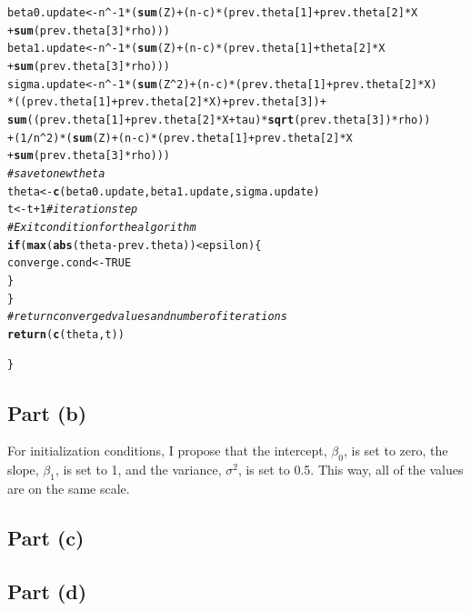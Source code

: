 \documentclass{article}\usepackage[]{graphicx}\usepackage[]{color}
\makeatletter
\newcommand{\hlnum}[1]{\textcolor[rgb]{0.686,0.059,0.569}{#1}}%
\newcommand{\hlcom}[1]{\textcolor[rgb]{0.678,0.584,0.686}{\textit{#1}}}%
\newcommand{\hlopt}[1]{\textcolor[rgb]{0,0,0}{#1}}%
\newcommand{\hlstd}[1]{\textcolor[rgb]{0.345,0.345,0.345}{#1}}%
\newcommand{\hlkwa}[1]{\textcolor[rgb]{0.161,0.373,0.58}{\textbf{#1}}}%
\newcommand{\hlkwb}[1]{\textcolor[rgb]{0.69,0.353,0.396}{#1}}%
\newcommand{\hlkwd}[1]{\textcolor[rgb]{0.737,0.353,0.396}{\textbf{#1}}}%
\newenvironment{kframe}{%
 \def\at@end@of@kframe{}%
 \ifinner\ifhmode%
  \def\at@end@of@kframe{\end{minipage}}%
  \begin{minipage}{\columnwidth}%
 \fi\fi%
 \def\FrameCommand##1{\hskip\@totalleftmargin \hskip-\fboxsep
 \colorbox{shadecolor}{##1}\hskip-\fboxsep
     \hskip-\linewidth \hskip-\@totalleftmargin \hskip\columnwidth}%
 \MakeFramed {\advance\hsize-\width
   \@totalleftmargin\z@ \linewidth\hsize
   \@setminipage}}%
 {\par\unskip\endMakeFramed%
 \at@end@of@kframe}
\newenvironment{knitrout}{}{} %
\makeatother
\begin{document}
\begin{knitrout}
\begin{kframe}
\begin{alltt}
    \hlstd{beta0.update} \hlkwb{<-} \hlstd{n}\hlopt{^-}\hlnum{1}\hlopt{*}\hlstd{(}\hlkwd{sum}\hlstd{(Z)} \hlopt{+} \hlstd{(n} \hlopt{-} \hlstd{c)}\hlopt{*}\hlstd{(prev.theta[}\hlnum{1}\hlstd{]} \hlopt{+} \hlstd{prev.theta[}\hlnum{2}\hlstd{]}\hlopt{*}\hlstd{X}
                                      \hlopt{+} \hlkwd{sum}\hlstd{(prev.theta[}\hlnum{3}\hlstd{]}\hlopt{*}\hlstd{rho)))}
    \hlstd{beta1.update} \hlkwb{<-} \hlstd{n}\hlopt{^-}\hlnum{1}\hlopt{*}\hlstd{(}\hlkwd{sum}\hlstd{(Z)} \hlopt{+} \hlstd{(n} \hlopt{-} \hlstd{c)}\hlopt{*}\hlstd{(prev.theta[}\hlnum{1}\hlstd{]} \hlopt{+} \hlstd{theta[}\hlnum{2}\hlstd{]}\hlopt{*}\hlstd{X}
                                      \hlopt{+} \hlkwd{sum}\hlstd{(prev.theta[}\hlnum{3}\hlstd{]}\hlopt{*}\hlstd{rho)))}
    \hlstd{sigma.update} \hlkwb{<-} \hlstd{n}\hlopt{^-}\hlnum{1}\hlopt{*}\hlstd{(}\hlkwd{sum}\hlstd{(Z}\hlopt{^}\hlnum{2}\hlstd{)} \hlopt{+} \hlstd{(n} \hlopt{-} \hlstd{c)}\hlopt{*}\hlstd{(prev.theta[}\hlnum{1}\hlstd{]} \hlopt{+} \hlstd{prev.theta[}\hlnum{2}\hlstd{]}\hlopt{*}\hlstd{X)}
                          \hlopt{*}\hlstd{((prev.theta[}\hlnum{1}\hlstd{]} \hlopt{+} \hlstd{prev.theta[}\hlnum{2}\hlstd{]}\hlopt{*}\hlstd{X)} \hlopt{+} \hlstd{prev.theta[}\hlnum{3}\hlstd{])} \hlopt{+}
                            \hlkwd{sum}\hlstd{((prev.theta[}\hlnum{1}\hlstd{]} \hlopt{+} \hlstd{prev.theta[}\hlnum{2}\hlstd{]}\hlopt{*}\hlstd{X} \hlopt{+} \hlstd{tau)}\hlopt{*}\hlkwd{sqrt}\hlstd{(prev.theta[}\hlnum{3}\hlstd{])}\hlopt{*}\hlstd{rho))}
                          \hlopt{+} \hlstd{(}\hlnum{1}\hlopt{/}\hlstd{n}\hlopt{^}\hlnum{2}\hlstd{)}\hlopt{*}\hlstd{(}\hlkwd{sum}\hlstd{(Z)} \hlopt{+} \hlstd{(n} \hlopt{-} \hlstd{c)}\hlopt{*}\hlstd{(prev.theta[}\hlnum{1}\hlstd{]} \hlopt{+} \hlstd{prev.theta[}\hlnum{2}\hlstd{]}\hlopt{*}\hlstd{X}
                          \hlopt{+} \hlkwd{sum}\hlstd{(prev.theta[}\hlnum{3}\hlstd{]}\hlopt{*}\hlstd{rho)))}
    \hlcom{#save to new theta}
    \hlstd{theta} \hlkwb{<-} \hlkwd{c}\hlstd{(beta0.update, beta1.update, sigma.update)}
    \hlstd{t} \hlkwb{<-} \hlstd{t} \hlopt{+} \hlnum{1} \hlcom{#iteration step}
    \hlcom{#Exit condition for the algorithm}
    \hlkwa{if}\hlstd{(}\hlkwd{max}\hlstd{(}\hlkwd{abs}\hlstd{(theta} \hlopt{-} \hlstd{prev.theta))} \hlopt{<} \hlstd{epsilon ) \{}
      \hlstd{converge.cond} \hlkwb{<-} \hlnum{TRUE}
    \hlstd{\}}
  \hlstd{\}}
  \hlcom{#return converged values and number of iterations}
  \hlkwd{return}\hlstd{(}\hlkwd{c}\hlstd{(theta, t))}

\hlstd{\}}
\end{alltt}
\end{kframe}
\end{knitrout}

\subsection{Part (b)}
For initialization conditions, I propose that the intercept, $\beta_0$, is set to zero, the slope, $\beta_1$, is set to 1, and the variance, $\sigma^2$, is set to 0.5.  This way, all of the values are on the same scale.
\subsection{Part (c)}
\subsection{Part (d)}
\end{document}
